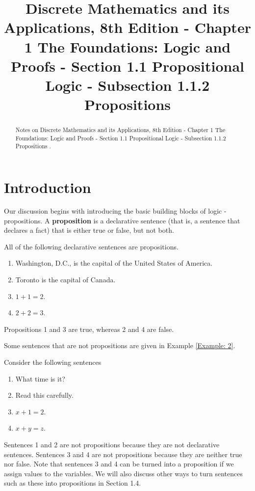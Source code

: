 \documentclass{Axon}
\title{Discrete Mathematics and its Applications, 8th Edition - Chapter 1 The Foundations: Logic and Proofs - Section 1.1 Propositional Logic - Subsection 1.1.2 Propositions}
\begin{document}
\maketitle
\makeauthor
\begin{abstract}
Notes on Discrete Mathematics and its Applications, 8th Edition - Chapter 1 The Foundations: Logic and Proofs - Section 1.1 Propositional Logic - Subsection 1.1.2 Propositions \cite{Rosen}.
\end{abstract}
\section{Introduction}
Our discussion begins with introducing the basic building blocks of logic - propositions. A \textbf{proposition} is a declarative sentence (that is, a sentence that declares a fact) that is either true or false, but not both.

\begin{example}
    All of the following declarative sentences are propositions.
    \begin{enumerate}
        \item Washington, D.C., is the capital of the United States of America.
        \item Toronto is the capital of Canada.
        \item \(1 + 1 = 2\).
        \item \(2 + 2 = 3\).
    \end{enumerate}
    Propositions 1 and 3 are true, whereas 2 and 4 are false.
\end{example}

Some sentences that are not propositions are given in Example \ref{Example: 2}.

\begin{example}\label{Example: 2}
    Consider the following sentences
    \begin{enumerate}
        \item What time is it?
        \item Read this carefully.
        \item \(x + 1 = 2\).
        \item \(x + y = z\).
    \end{enumerate}
    Sentences 1 and 2 are not propositions because they are not declarative sentences. Sentences 3 and 4 are not propositions because they are neither true nor false. Note that sentences 3 and 4 can be turned into a proposition if we assign values to the variables. We will also discuss other ways to turn sentences such as these into propositions in Section 1.4.
\end{example}
\end{document}
